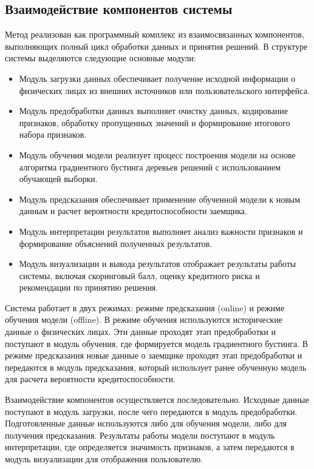 \subsection{Взаимодействие компонентов системы}

Метод реализован как программный комплекс из взаимосвязанных компонентов, выполняющих полный цикл обработки данных и принятия решений. В структуре системы выделяются следующие основные модули:

\begin{itemize}
  \item Модуль загрузки данных обеспечивает получение исходной информации о физических лицах из внешних источников или пользовательского интерфейса.

  \item Модуль предобработки данных выполняет очистку данных, кодирование признаков, обработку пропущенных значений и формирование итогового набора признаков.

  \item Модуль обучения модели реализует процесс построения модели на основе алгоритма градиентного бустинга деревьев решений с использованием обучающей выборки.

  \item Модуль предсказания обеспечивает применение обученной модели к новым данным и расчет вероятности кредитоспособности заемщика.

  \item Модуль интерпретации результатов выполняет анализ важности признаков и формирование объяснений полученных результатов.

  \item Модуль визуализации и вывода результатов отображает результаты работы системы, включая скоринговый балл, оценку кредитного риска и рекомендации по принятию решения.
\end{itemize}

Система работает в двух режимах: режиме предсказания (online) и режиме обучения модели (offline). В режиме обучения используются исторические данные о физических лицах. Эти данные проходят этап предобработки и поступают в модуль обучения, где формируется модель градиентного бустинга. В режиме предсказания новые данные о заемщике проходят этап предобработки и передаются в модуль предсказания, который использует ранее обученную модель для расчета вероятности кредитоспособности.

Взаимодействие компонентов осуществляется последовательно. Исходные данные поступают в модуль загрузки, после чего передаются в модуль предобработки. Подготовленные данные используются либо для обучения модели, либо для получения предсказания. Результаты работы модели поступают в модуль интерпретации, где определяется значимость признаков, а затем передаются в модуль визуализации для отображения пользователю.

